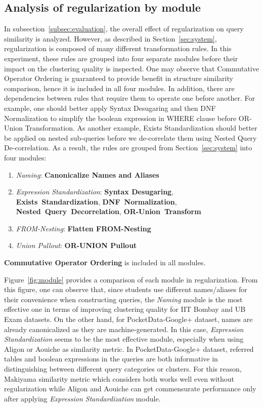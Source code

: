\subsection{Analysis of regularization by module}
\label{subsec:modules}
In subsection~\ref{subsec:evaluation}, the overall effect of regularization on query similarity is analyzed.  
However, as described in Section~\ref{sec:system}, regularization is composed of many different transformation rules.  
In this experiment, these rules are grouped into four separate modules before their impact on the clustering quality is inspected. 
One may observe that Commutative Operator Ordering is guaranteed to provide benefit in structure similarity comparison, hence it is included in all four modules. 
In addition, there are dependencies between rules that require them to operate one before another. 
For example, one should better apply Syntax Desugaring and then DNF Normalization to simplify the boolean expression in WHERE clause before OR-Union Transformation.
As another example, Exists Standardization should better be applied on nested sub-queries before we de-correlate them using Nested Query De-correlation.
As a result, the rules are grouped from Section~\ref{sec:system} into four modules:
\begin{enumerate}
\item \textit{Naming}: \textbf{Canonicalize Names and Aliases}
\item \textit{Expression Standardization}: \textbf{Syntax Desugaring}, \\\textbf{Exists~Standardization}, \textbf{DNF~Normalization}, \\\textbf{Nested~Query~Decorrelation}, \textbf{OR-Union~Transform}
\item \textit{FROM-Nesting}: \textbf{Flatten FROM-Nesting}
\item \textit{Union Pullout}: \textbf{OR-UNION Pullout}
\end{enumerate}
\textbf{Commutative Operator Ordering} is included in all modules.

Figure~\ref{fig:module} provides a comparison of each module in regularization. 
From this figure, one can observe that, since students use different names/aliases for their convenience when constructing queries, the \textit{Naming} module is the most effective one in terms of improving clustering quality for IIT Bombay and UB Exam datasets. 
On the other hand, for PocketData-Google+ dataset, names are already canonicalized as they are machine-generated. 
In this case, \textit{Expression Standardization} seems to be the most effective module, especially when using Aligon or Aouiche as similarity metric. 
In PocketData-Google+ dataset, referred tables and boolean expressions in the queries are both informative in distinguishing between different query categories or clusters. For this reason, Makiyama similarity metric which considers both works well even without regularization while Aligon and Aouiche can get commensurate performance only after applying \textit{Expression Standardization} module. 

